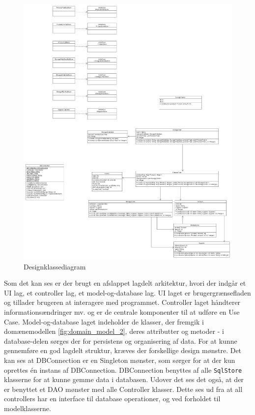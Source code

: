 \begin{landscape}
    \begin{figure}
        \centering
        \includegraphics[width=0.6\hsize]{figures/design/designclassdiagram}
        \caption{Designklassediagram}
        \label{fig:new_designclassdiagram}
    \end{figure}
\end{landscape}
Som det kan ses er der brugt en afslappet lagdelt arkitektur, hvori der indgår et UI lag, et controller lag, et model-og-database lag\cite{Larman2004}. UI laget er brugergrænsefladen og tillader brugeren at interagere med programmet. Controller laget håndterer informationsændringer mv. og er de centrale komponenter til at udføre en Use Case. Model-og-database laget indeholder de klasser, der fremgik i domænemodellen \ref{fig:domain_model_2}, deres attributter og metoder - i database-delen sørges der for persistens og organisering af data. 
For at kunne gennemføre en god lagdelt struktur, kræves der forskellige design mønstre. Det kan ses at DBConnection er en Singleton mønster\cite{Larman2004}, som sørger for at der kun oprettes én instans af DBConnection. DBConnection benyttes af alle \verb|SqlStore| klasserne for at kunne gemme data i databasen. Udover det ses det også, at der er benyttet et DAO mønster\cite{DAO} med alle Controller klasser. Dette ses ud fra at all controllers har en interface til database operationer, og ved forholdet til modelklasserne.
